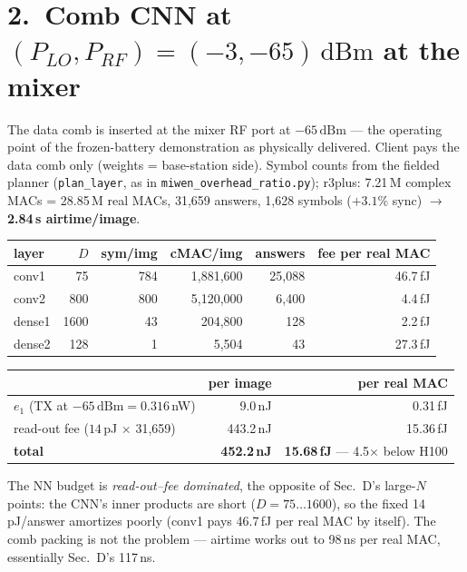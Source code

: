 \documentclass[11pt]{article}
\newcommand{\dbm}{\,\mathrm{dBm}}
\begin{document}
\section*{2.\ Comb CNN at $(P_{LO},P_{RF})=(-3,-65)\dbm$ at the mixer}
The data comb is inserted at the mixer RF port at $-65\dbm$ --- the
operating point of the frozen-battery demonstration as physically
delivered. Client pays the data comb only (weights = base-station side). Symbol counts from the fielded planner
(\texttt{plan\_layer}, as in \texttt{miwen\_overhead\_ratio.py});
r3plus: 7.21\,M complex MACs = 28.85\,M real MACs,
31,659 answers, 1,628 symbols ($+3.1\%$ sync) $\to$
\textbf{2.84\,s airtime/image}.
\begin{center}\begin{tabular}{lrrrrr}
\toprule
layer & $D$ & sym/img & cMAC/img & answers & fee per real MAC\\
\midrule
conv1 & 75 & 784 & 1,881,600 & 25,088 & 46.7\,fJ\\
conv2 & 800 & 800 & 5,120,000 & 6,400 & 4.4\,fJ\\
dense1 & 1600 & 43 & 204,800 & 128 & 2.2\,fJ\\
dense2 & 128 & 1 & 5,504 & 43 & 27.3\,fJ\\
\bottomrule
\end{tabular}\end{center}
\begin{center}\begin{tabular}{lrr}
\toprule
 & per image & per real MAC\\
\midrule
$e_1$ (TX at $-65\dbm = 0.316$\,nW) & 9.0\,nJ & 0.31\,fJ\\
read-out fee ($14$\,pJ $\times$ 31,659) & 443.2\,nJ & 15.36\,fJ\\
\textbf{total} & \textbf{452.2\,nJ} & \textbf{15.68\,fJ}
--- 4.5$\times$ below H100\\
\bottomrule
\end{tabular}\end{center}
The NN budget is \emph{read-out--fee dominated}, the opposite of Sec.~D's
large-$N$ points: the CNN's inner products are short
($D=75\ldots1600$), so the fixed 14\,pJ/answer amortizes poorly (conv1 pays
46.7\,fJ per real MAC by itself). The comb packing is not the
problem --- airtime works out to 98\,ns per real MAC,
essentially Sec.~D's 117\,ns.
\end{document}
